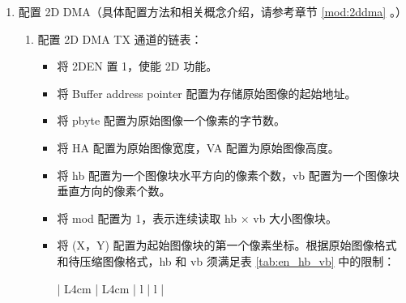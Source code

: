 \documentclass[main\_\_CN.tex]{subfiles}
\begin{document}
\begin{enumerate}
\begin{itemize}
\begin{itemize}
        \end{itemize}
        \item 配置 \hyperref[fielddesc:JPEGSAMPLESEL]{JPEG\_SAMPLE\_SEL} 选择待压缩图像格式：
                \begin{itemize}
                    \item 0：YUV444
                    \item 1：YUV422
                    \item 2：YUV420
                \end{itemize}
        注意：该字段仅在原始图像格式为 RGB 时有效。详见表 \ref{tab:csc_result} \textit{}。
        \item 将 \hyperref[fielddesc:JPEGHA]{JPEG\_HA} 配置为原始图像宽度，\hyperref[fielddesc:JPEGVA]{JPEG\_VA} 配置为原始图像高度。
        \item 参考章节 \ref{sec:jpegcodec-enc-qnr} \textit{} 的说明配置量化系数表。
        \item 参考章节 \ref{sec:jpegcodec-enc-timeout} \textit{} 的说明配置超时检测功能。
    \end{itemize}
    \item 配置 2D DMA（具体配置方法和相关概念介绍，请参考章节 \ref{mod:2ddma}
    \textit{}。）
    \begin{enumerate}
        \item 配置 2D DMA TX 通道的链表：
        \begin{itemize}
            \item 将 2DEN 置 1，使能 2D 功能。
            \item 将 Buffer address pointer 配置为存储原始图像的起始地址。
            \item 将 pbyte 配置为原始图像一个像素的字节数。
            \item 将 HA 配置为原始图像宽度，VA 配置为原始图像高度。
            \item 将 hb 配置为一个图像块水平方向的像素个数，vb 配置为一个图像块垂直方向的像素个数。
            \item 将 mod 配置为 1，表示连续读取 hb × vb 大小图像块。
            \item 将 (X，Y) 配置为起始图像块的第一个像素坐标。根据原始图像格式和待压缩图像格式，hb 和 vb 须满足表 \ref{tab:en_hb_vb} \textit{} 中的限制：
        \begin{longtable}{ | L{4cm} | L{4cm} | l | l |}
        \caption{JPEG 编码器 hb 和 vb 配置} \label{tab:en_hb_vb}

\end{longtable}
\end{itemize}
\end{enumerate}
\end{enumerate}
\end{document}
